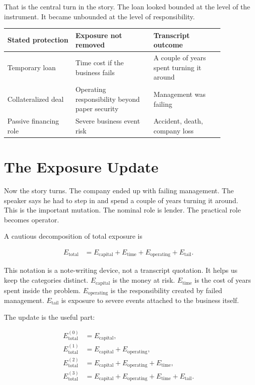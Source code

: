 That is the central turn in the story. The loan looked bounded at the level of the instrument. It became unbounded at the level of responsibility.

\begin{table}
\centering
\begin{tabular}{p{0.27\linewidth} p{0.31\linewidth} p{0.29\linewidth}}
\hline
Stated protection & Exposure not removed & Transcript outcome \\
\hline
Temporary loan & Time cost if the business fails & A couple of years spent turning it around \\
Collateralized deal & Operating responsibility beyond paper security & Management was failing \\
Passive financing role & Severe business event risk & Accident, death, company loss \\
\hline
\end{tabular}
\end{table}

\section{The Exposure Update}

Now the story turns. The company ended up with failing management. The speaker says he had to step in and spend a couple of years turning it around. This is the important mutation. The nominal role is lender. The practical role becomes operator.

A cautious decomposition of total exposure is

\begin{align}
E_{\text{total}}
&=
E_{\text{capital}}
+
E_{\text{time}}
+
E_{\text{operating}}
+
E_{\text{tail}}.
\end{align}

This notation is a note-writing device, not a transcript quotation. It helps us keep the categories distinct. \(E_{\text{capital}}\) is the money at risk. \(E_{\text{time}}\) is the cost of years spent inside the problem. \(E_{\text{operating}}\) is the responsibility created by failed management. \(E_{\text{tail}}\) is exposure to severe events attached to the business itself.

The update is the useful part:

\begin{align}
E_{\text{total}}^{(0)}
&=
E_{\text{capital}},
\\
E_{\text{total}}^{(1)}
&=
E_{\text{capital}}
+
E_{\text{operating}},
\\
E_{\text{total}}^{(2)}
&=
E_{\text{capital}}
+
E_{\text{operating}}
+
E_{\text{time}},
\\
E_{\text{total}}^{(3)}
&=
E_{\text{capital}}
+
E_{\text{operating}}
+
E_{\text{time}}
+
E_{\text{tail}}.
\end{align}

